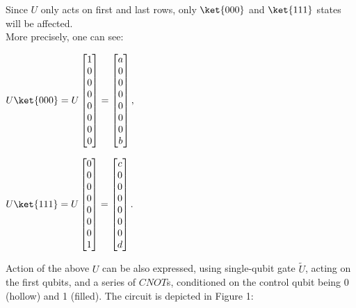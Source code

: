 {Since $U$ only acts on first and last rows, only $\ket{000}$ and $\ket{111}$ states will be affected. \\
More precisely, one can see: \\
\begin{center}
$U \ket{000} = U
\begin{bmatrix}
 1 \\ 
 0 \\    
 0 \\
 0 \\
 0 \\
 0 \\
 0 \\
 0 \\
\end{bmatrix}
= 
\begin{bmatrix}
 a \\ 
 0 \\    
 0 \\
 0 \\
 0 \\
 0 \\
 0 \\
 b \\
\end{bmatrix},$
\end{center}
\begin{center}
$U \ket{111} = U
\begin{bmatrix}
 0 \\ 
 0 \\    
 0 \\
 0 \\
 0 \\
 0 \\
 0 \\
 1 \\
\end{bmatrix}
= 
\begin{bmatrix}
 c \\ 
 0 \\    
 0 \\
 0 \\
 0 \\
 0 \\
 0 \\
 d \\
\end{bmatrix}.
$
\end{center}

Action of the above $U$ can be also expressed, using single-qubit gate $\tilde U$, acting on the first qubits, and a series of $CNOT$s, conditioned on the control qubit being 0 (hollow) and 1 (filled). The circuit is depicted in Figure 1:

}
